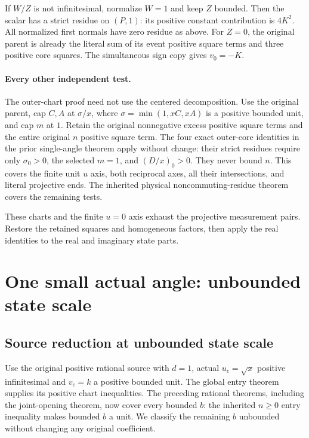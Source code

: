 If $W/Z$ is not infinitesimal, normalize $W=1$ and keep $Z$
bounded.  Then the scalar has a strict residue on $(P,1)$:
its positive constant contribution is $4K^2$.  All normalized
first normals have zero residue as above.  For $Z=0$, the original
parent is already the literal sum of its event positive square terms and three
positive core squares.  The simultaneous sign copy gives $v_0=-K$.

\paragraph{Every other independent test.}
The outer-chart proof need not use the centered decomposition.
Use the original parent, cap $C,A$ at $\sigma/x$, where
$\sigma=\min(1,xC,xA)$ is a positive bounded unit, and cap $m$ at
$1$.  Retain the original nonnegative excess positive square terms and the
entire original $n$ positive square term.  The four exact outer-core identities
in the prior single-angle theorem apply without change: their
strict residues require only $\sigma_0>0$, the selected $m=1$,
and $(D/x)_0>0$.  They never bound $n$.  This covers the finite
unit $u$ axis, both reciprocal axes, all their intersections, and
literal projective ends.  The inherited physical
noncommuting-residue theorem covers the remaining tests.

These charts and the finite $u=0$ axis exhaust the projective measurement
pairs. Restore the retained squares and homogeneous factors, then apply
the real identities to the real and imaginary state parts.

\section{One small actual angle: unbounded state scale}
\subsection{Source reduction at unbounded state scale}
\label{component:pb60046a37191}

\label{pb60046a37191:sec:c2-unbounded-b-reduction}

Use the original positive rational source with $d=1$, actual
$u_c=\sqrt x$ positive infinitesimal and $v_c=k$ a positive bounded
unit. The global entry theorem supplies its positive chart inequalities.
The preceding rational theorems, including the joint-opening theorem,
now cover every bounded $b$: the inherited $n\ge0$ entry inequality
makes bounded $b$ a unit. We classify the remaining $b$ unbounded
without changing any original coefficient.

